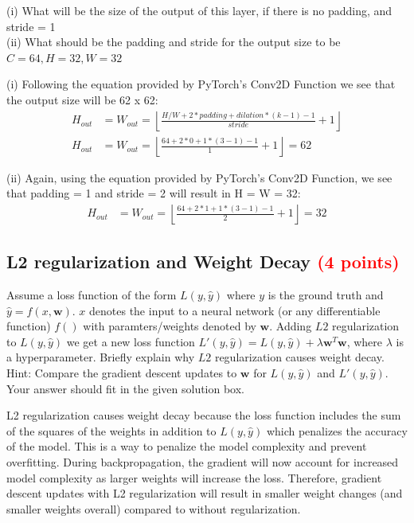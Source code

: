 \documentclass[answers]{exam}
\newcommand{\mypoints}[1]{\textcolor{red}{(#1 points)}}
\begin{document}
(i) What will be the size of the output of this layer, if there is no padding, and stride = 1  \\
(ii) What should be the padding and stride for the output size to be $C = 64, H = 32, W = 32$ 
\begin{solution}
(i) Following the equation provided by PyTorch's Conv2D Function we see that the output size will be 62 x 62:
\begin{align}
H_{out} &= W_{out} = \left \lfloor{\frac{H/W + 2*padding + dilation*(k - 1) - 1}{stride} + 1}\right \rfloor\\
H_{out} &= W_{out} = \left \lfloor{\frac{64 + 2*0 + 1*(3 - 1) - 1}{1} + 1}\right \rfloor = 62
\end{align}

(ii) Again, using the equation provided by PyTorch's Conv2D Function, we see that padding = 1 and stride = 2 will result in H = W = 32:
\begin{align}
H_{out} &= W_{out} = \left \lfloor{\frac{64 + 2*1 + 1*(3 - 1) - 1}{2} + 1}\right \rfloor = 32
\end{align}
\end{solution}

\subsection{L2 regularization and Weight Decay \mypoints{4}}
Assume a loss function of the form $L(y,\hat{y})$ where $y$ is the ground truth and $\hat{y} = f(x,\boldsymbol{w})$. $x$ denotes the input to a neural network (or any differentiable function) $f()$ with paramters/weights denoted by $\boldsymbol{w}$. Adding $L2$ regularization to $L(y, \hat{y})$ we get a new loss function $L'(y, \hat{y}) = L(y, \hat{y}) + \lambda \boldsymbol{w}^{T}\boldsymbol{w}$, where $\lambda$ is a hyperparameter. Briefly explain why $L2$ regularization causes weight decay. Hint: Compare the gradient descent updates to $\boldsymbol{w}$ for $L(y,\hat{y})$ and $L'(y, \hat{y})$. Your answer should fit in the given solution box.
\begin{solution}
L2 regularization causes weight decay because the loss function includes the sum of the squares of the weights in addition to $L(y,\hat{y})$ which penalizes the accuracy of the model. This is a way to penalize the model complexity and prevent overfitting. During backpropagation, the gradient will now account for increased model complexity as larger weights will increase the loss. Therefore, gradient descent updates with L2 regularization will result in smaller weight changes (and smaller weights overall) compared to without regularization.
\end{solution}
\end{document}
